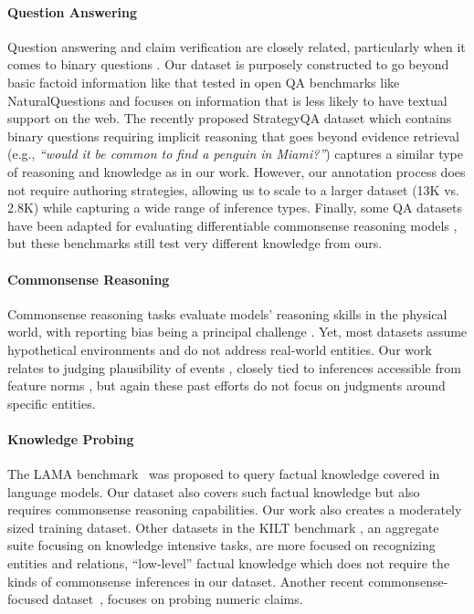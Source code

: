 \paragraph{Question Answering} Question answering and claim verification are closely related, particularly when it comes to binary questions \citep{Clark-etal-2019-boolq}. Our dataset is purposely constructed to go beyond basic factoid information like that tested in open QA benchmarks like NaturalQuestions \citep{Tom_Kwiatkowski_2019} and focuses on information that is less likely to have textual support on the web. The recently proposed StrategyQA dataset \citep{Mor_Geva_2021} which contains binary questions requiring implicit reasoning that goes beyond evidence retrieval (e.g., \emph{``would it be common to find a penguin in Miami?''}) captures a similar type of reasoning and knowledge as in our work. However, our annotation process does not require authoring strategies, allowing us to scale to a larger dataset (13K vs. 2.8K) while capturing a wide range of inference types. Finally, some QA datasets have been adapted for evaluating differentiable commonsense reasoning models \citep{lin-etal-2021-differentiable}, but these benchmarks still test very different knowledge from ours.

\paragraph{Commonsense Reasoning}
Commonsense reasoning tasks \citep[inter alia]{Hector_Levesque_2011, Rowan_Zellers_2018, Alon_Talmor_2019,Lourie_etal_2021_Unicorn} evaluate models' reasoning skills in the physical world, with reporting bias being a principal challenge \citep{Gordon2013ReportingBA}. Yet, most datasets assume hypothetical environments and do not address real-world entities. Our work relates to judging plausibility of events \citep{forbes-choi-2017-verb,wang-etal-2018-modeling}, closely tied to inferences accessible from feature norms \citep{McRae}, but again these past efforts do not focus on judgments around specific entities.

\paragraph{Knowledge Probing} The LAMA benchmark~\citep{Petroni-etal-2019-language} was proposed to query factual knowledge covered in language models. Our dataset also covers such factual knowledge but also requires commonsense reasoning capabilities. Our work also creates a moderately sized training dataset. Other datasets in the KILT benchmark \citep{Fabio_Petroni_2020}, an aggregate suite focusing on knowledge intensive tasks, are more focused on recognizing entities and relations, ``low-level'' factual knowledge which does not require the kinds of commonsense inferences in our dataset. Another recent commonsense-focused dataset~\citep{lin-etal-2020-birds}, focuses on probing numeric claims.

